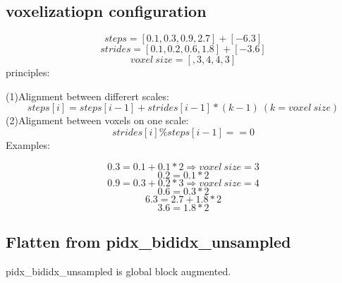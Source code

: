 \documentclass[,table,dvipsnames]{article}
\begin{document}
\subsection{voxelizatiopn configuration}
$$ steps = [0.1,0.3,0.9,2.7] + [-6.3]$$
$$ strides = [0.1,0.2,0.6,1.8] + [-3.6] $$
$$ voxel\ size=[, 3, 4, 4, 3] $$
principles:\par
(1)Alignment between differert scales:
$$ steps[i] = steps[i-1]+strides[i-1]*(k-1)\  (k=voxel\ size) $$
(2)Alignment between voxels on one scale:
$$ strides[i] \% steps[i-1] == 0 $$
Examples:\par
$$ 0.3=0.1+0.1*2 \Rightarrow voxel\ size=3 $$
$$ 0.2=0.1*2 $$
$$ 0.9=0.3+0.2*3 \Rightarrow voxel\ size=4 $$ 
$$ 0.6=0.3*2 $$
$$$$
$$ 6.3=2.7+1.8*2 $$
$$ 3.6=1.8*2 $$

\subsection{Flatten from pidx\_bididx\_unsampled}
pidx\_bididx\_unsampled is global block augmented.
\end{document}
